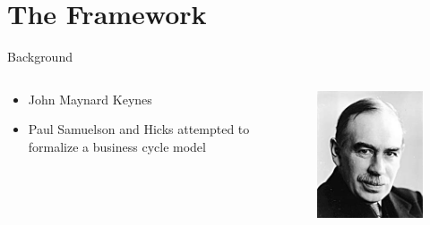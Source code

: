\documentclass{beamer}
\begin{document}
\section{The Framework}
\begin{frame}{Background}
	\begin{columns}
		\begin{column}{0.5\textwidth}
			\begin{itemize}
					\item
						John Maynard Keynes
					\pause
					\item
						Paul Samuelson and Hicks attempted to formalize a business cycle model\autocite{Puu2003}
				\end{itemize}
		\end{column}
		\begin{column}{0.5\textwidth}
			\begin{figure}
				\centering
				\includegraphics[width=\textwidth]{keynes.jpg}
			\end{figure}
		\end{column}
	\end{columns}
\end{frame}
\end{document}
